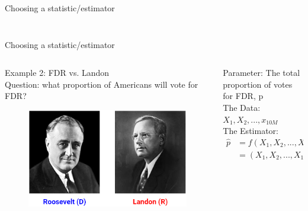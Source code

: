 \documentclass[aspectratio=169]{../latex_main/tntbeamer}  %
\begin{document}
\begin{frame}{Choosing a statistic/estimator}
\begin{columns}
\begin{column}{.5\textwidth}
\begin{figure}
	            \end{figure}
	        \end{column}
	        \end{columns}

	    
	\end{frame}
	
	
	\begin{frame}{Choosing a statistic/estimator}
	    \begin{columns}
	        \begin{column}{.4\textwidth}
	            Example 2: FDR vs. Landon\\
	            \bigskip
	            Question: what proportion of Americans will vote for FDR?\\
	           \begin{figure}
	               \includegraphics[scale=.3]{Bild27}
	           \end{figure}
	        \end{column}
	        
	        \begin{column}{.5\textwidth}
	            Parameter: The total proportion of votes for FDR, p\\
	            The Data: $X_1, X_2, ..., x_{10M}$\\
	            The Estimator:
                \begin{align*}
                    \hat{p} &= f(X_1, X_2,...,X_{10M};n)\\
                    &= (X_1, X_2,...,X_{10M})/n
                \end{align*}
	        \end{column}
	        \end{columns}

	    
	\end{frame}
	
\end{document}
